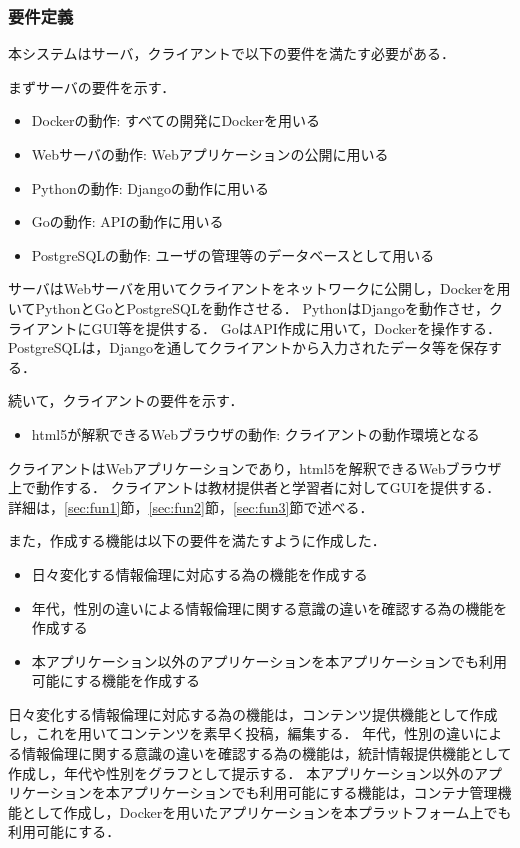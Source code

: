\subsubsection{要件定義}
本システムはサーバ，クライアントで以下の要件を満たす必要がある．

まずサーバの要件を示す．

\begin{itemize}
    \item Dockerの動作: すべての開発にDockerを用いる
    \item Webサーバの動作: Webアプリケーションの公開に用いる
    \item Pythonの動作: Djangoの動作に用いる
    \item Goの動作: APIの動作に用いる
    \item PostgreSQLの動作: ユーザの管理等のデータベースとして用いる
\end{itemize}

サーバはWebサーバを用いてクライアントをネットワークに公開し，Dockerを用いてPythonとGoとPostgreSQLを動作させる．
PythonはDjangoを動作させ，クライアントにGUI等を提供する．
GoはAPI作成に用いて，Dockerを操作する．
PostgreSQLは，Djangoを通してクライアントから入力されたデータ等を保存する．

続いて，クライアントの要件を示す．

\begin{itemize}
    \item html5が解釈できるWebブラウザの動作: クライアントの動作環境となる 
\end{itemize}

クライアントはWebアプリケーションであり，html5を解釈できるWebブラウザ上で動作する．
クライアントは教材提供者と学習者に対してGUIを提供する．
詳細は，\ref{sec:fun1}節，\ref{sec:fun2}節，\ref{sec:fun3}節で述べる．

また，作成する機能は以下の要件を満たすように作成した．

\begin{itemize}
    \item 日々変化する情報倫理に対応する為の機能を作成する
    \item 年代，性別の違いによる情報倫理に関する意識の違いを確認する為の機能を作成する
    \item 本アプリケーション以外のアプリケーションを本アプリケーションでも利用可能にする機能を作成する
\end{itemize}

日々変化する情報倫理に対応する為の機能は，コンテンツ提供機能として作成し，これを用いてコンテンツを素早く投稿，編集する．
年代，性別の違いによる情報倫理に関する意識の違いを確認する為の機能は，統計情報提供機能として作成し，年代や性別をグラフとして提示する．
本アプリケーション以外のアプリケーションを本アプリケーションでも利用可能にする機能は，コンテナ管理機能として作成し，Dockerを用いたアプリケーションを本プラットフォーム上でも利用可能にする．


